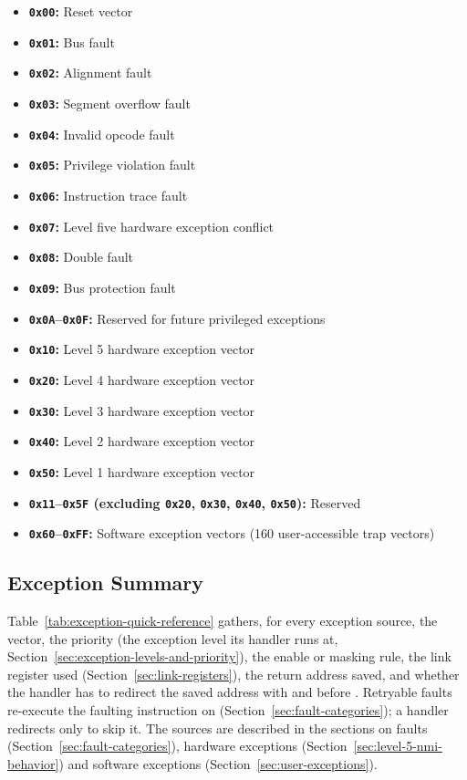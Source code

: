 \begin{itemize}
	\item \textbf{\texttt{0x00}:} Reset vector
	\item \textbf{\texttt{0x01}:} Bus fault
	\item \textbf{\texttt{0x02}:} Alignment fault
	\item \textbf{\texttt{0x03}:} Segment overflow fault
	\item \textbf{\texttt{0x04}:} Invalid opcode fault
	\item \textbf{\texttt{0x05}:} Privilege violation fault
	\item \textbf{\texttt{0x06}:} Instruction trace fault
	\item \textbf{\texttt{0x07}:} Level five hardware exception conflict
	\item \textbf{\texttt{0x08}:} Double fault
	\item \textbf{\texttt{0x09}:} Bus protection fault
	\item \textbf{\texttt{0x0A}--\texttt{0x0F}:} Reserved for future privileged exceptions
	\item \textbf{\texttt{0x10}:} Level 5 hardware exception vector
	\item \textbf{\texttt{0x20}:} Level 4 hardware exception vector
	\item \textbf{\texttt{0x30}:} Level 3 hardware exception vector
	\item \textbf{\texttt{0x40}:} Level 2 hardware exception vector
	\item \textbf{\texttt{0x50}:} Level 1 hardware exception vector
	\item \textbf{\texttt{0x11}--\texttt{0x5F} (excluding \texttt{0x20}, \texttt{0x30}, \texttt{0x40}, \texttt{0x50}):} Reserved
	\item \textbf{\texttt{0x60}--\texttt{0xFF}:} Software exception vectors (160 user-accessible trap vectors)
\end{itemize}

\subsection{Exception Summary}
\label{sec:exception-summary}

Table~\ref{tab:exception-quick-reference} gathers, for every exception source, the vector, the priority (the exception
level its handler runs at, Section~\ref{sec:exception-levels-and-priority}), the enable or masking rule, the link
register used (Section~\ref{sec:link-registers}), the return address saved, and whether the handler has to redirect the
saved address with  and  before . Retryable faults re-execute the faulting
instruction on  (Section~\ref{sec:fault-categories}); a handler redirects only to skip it. The sources
are described in the sections on faults (Section~\ref{sec:fault-categories}), hardware exceptions
(Section~\ref{sec:level-5-nmi-behavior}) and software exceptions (Section~\ref{sec:user-exceptions}).

